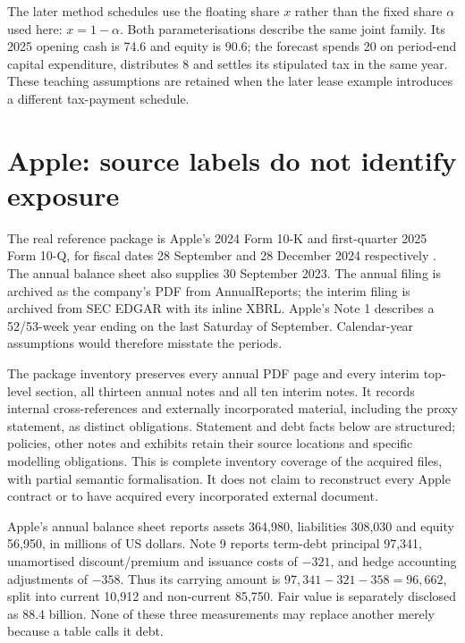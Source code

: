 The later method schedules use the floating share $x$ rather than the fixed
share $\alpha$ used here: $x=1-\alpha$. Both parameterisations describe the
same joint family. Its 2025 opening cash is 74.6 and equity is 90.6; the
forecast spends 20 on period-end capital expenditure, distributes 8 and settles
its stipulated tax in the same year. These teaching assumptions are retained
when the later lease example introduces a different tax-payment schedule.



\section{Apple: source labels do not identify exposure}
\label{sec:apple}

The real reference package is Apple's 2024 Form 10-K and first-quarter 2025
Form 10-Q, for fiscal dates 28 September and 28 December 2024 respectively
\citep{apple2024,apple2025q1}. The annual balance sheet also supplies
30 September 2023. The annual filing is archived as the company's PDF from
AnnualReports; the interim filing is archived from SEC EDGAR with its inline
XBRL. Apple's Note 1 describes a 52/53-week year ending on the last Saturday
of September. Calendar-year assumptions would therefore misstate the periods.

The package inventory preserves every annual PDF page and every interim
top-level section, all thirteen annual notes and all ten interim notes.
It records internal cross-references and externally incorporated material,
including the proxy statement, as distinct obligations. Statement and debt
facts below are structured; policies, other notes and exhibits retain their
source locations and specific modelling obligations. This is complete
inventory coverage of the acquired files, with partial semantic formalisation.
It does not claim to reconstruct every Apple contract or to have acquired
every incorporated external document.

Apple's annual balance sheet reports assets 364,980, liabilities 308,030 and
equity 56,950, in millions of US dollars. Note 9 reports term-debt principal
97,341, unamortised discount/premium and issuance costs of $-321$, and hedge
accounting adjustments of $-358$. Thus its carrying amount is
$97{,}341-321-358=96{,}662$, split into current 10,912 and non-current
85,750. Fair value is separately disclosed as 88.4 billion. None of these
three measurements may replace another merely because a table calls it debt.

